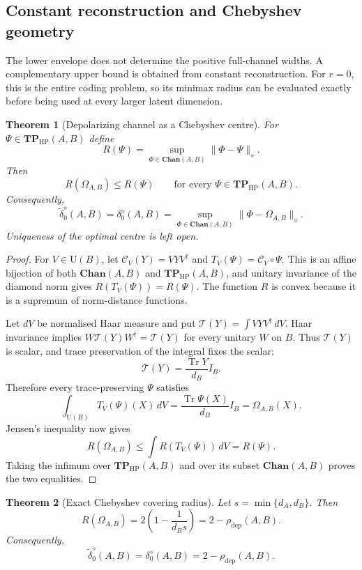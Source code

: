 \documentclass[11pt,a4paper]{article}
\theoremstyle{definition}
\theoremstyle{plain}
\newtheorem{theorem}{Theorem}[section]
\theoremstyle{remark}
\DeclareMathOperator{\Tr}{Tr}
\newcommand{\Chan}{\mathbf{Chan}}
\newcommand{\TPHP}{\mathbf{TP}_{\mathrm{HP}}}
\newcommand{\rhodep}{\rho_{\mathrm{dep}}}
\begin{document}
\subsection{Constant reconstruction and Chebyshev geometry}

The lower envelope does not determine the positive full-channel widths. A
complementary upper bound is obtained from constant reconstruction. For
$r=0$, this is the entire coding problem, so its minimax radius can be
evaluated exactly before being used at every larger latent dimension.

\begin{theorem}[Depolarizing channel as a Chebyshev centre]
\label{thm:depolarizing-chebyshev}
For $\Psi\in\TPHP(A,B)$ define
\[
R(\Psi)=\sup_{\Phi\in\Chan(A,B)}\|\Phi-\Psi\|_\diamond.
\]
Then
\[
R(\Omega_{A,B})\leq R(\Psi)
\qquad\text{for every }\Psi\in\TPHP(A,B).
\]
Consequently,
\[
\widetilde\delta_0^\diamond(A,B)
=\delta_0^\diamond(A,B)
=\sup_{\Phi\in\Chan(A,B)}
\|\Phi-\Omega_{A,B}\|_\diamond.
\]
Uniqueness of the optimal centre is left open.
\end{theorem}

\begin{proof}
For $V\in\mathrm U(B)$, let
$\mathcal C_V(Y)=VYV^\dagger$ and
$T_V(\Psi)=\mathcal C_V\circ\Psi$. This is an affine bijection of both
$\Chan(A,B)$ and $\TPHP(A,B)$, and unitary invariance of the diamond norm
gives $R(T_V(\Psi))=R(\Psi)$. The function $R$ is convex because it is a
supremum of norm-distance functions.

Let $dV$ be normalised Haar measure and put
$\mathcal T(Y)=\int VYV^\dagger\,dV$. Haar invariance implies
$W\mathcal T(Y)W^\dagger=\mathcal T(Y)$ for every unitary $W$ on $B$.
Thus $\mathcal T(Y)$ is scalar, and trace preservation of the integral fixes
the scalar:
\[
\mathcal T(Y)=\frac{\Tr Y}{d_B}I_B.
\]
Therefore every trace-preserving $\Psi$ satisfies
\[
\int_{\mathrm U(B)}T_V(\Psi)(X)\,dV
=\frac{\Tr\Psi(X)}{d_B}I_B
=\Omega_{A,B}(X).
\]
Jensen's inequality now gives
\[
R(\Omega_{A,B})
\leq\int R(T_V(\Psi))\,dV
=R(\Psi).
\]
Taking the infimum over $\TPHP(A,B)$ and over its subset $\Chan(A,B)$
proves the two equalities.
\end{proof}

\begin{theorem}[Exact Chebyshev covering radius]
\label{thm:exact-chebyshev-radius}
Let $s=\min\{d_A,d_B\}$. Then
\[
R(\Omega_{A,B})
=2\left(1-\frac1{d_Bs}\right)
=2-\rhodep(A,B).
\]
Consequently,
\[
\widetilde\delta_0^\diamond(A,B)
=\delta_0^\diamond(A,B)
=2-\rhodep(A,B).
\]
\end{theorem}
\end{document}

